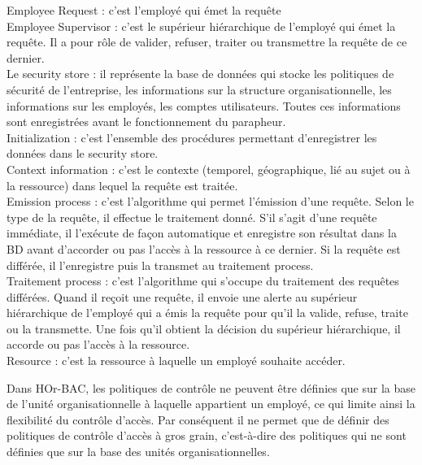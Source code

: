 Employee Request : c'est l'employé qui émet la requête \\
Employee Supervisor : c'est le supérieur hiérarchique de l'employé qui émet la requête. Il a pour rôle de valider, refuser, traiter ou transmettre la requête de ce dernier.\\
Le security store : il représente la base de données qui stocke les politiques de sécurité de l'entreprise, les informations sur la structure organisationnelle, les informations sur les employés, les comptes utilisateurs. Toutes ces informations sont enregistrées avant le fonctionnement du parapheur.\\  
Initialization : c'est l'ensemble des procédures permettant d'enregistrer les données dans le security store.\\
Context information : c'est le contexte (temporel, géographique, lié au sujet ou à la ressource) dans lequel la requête est traitée.\\
Emission process : c'est l'algorithme qui permet l'émission d'une requête. Selon le type de la requête, il effectue le traitement donné. S'il s'agit d'une requête immédiate, il l'exécute de façon automatique et enregistre son résultat dans la BD avant d'accorder ou pas l'accès à la ressource à ce dernier. Si la requête est différée, il l'enregistre puis la transmet au traitement process.\\
Traitement process : c'est l'algorithme qui s'occupe du traitement des requêtes différées. Quand il reçoit une requête, il envoie une alerte au supérieur hiérarchique de l'employé qui a émis la requête pour qu'il la valide, refuse, traite ou la transmette. Une fois qu'il obtient la décision du supérieur hiérarchique, il accorde ou pas l'accès à la ressource.\\
Resource : c'est la ressource à laquelle un employé souhaite accéder.


\label{sectionInconveniantHOr-BAC}

Dans HOr-BAC, les politiques de contrôle ne peuvent être définies que sur la base de l'unité organisationnelle à laquelle appartient un employé, ce qui limite ainsi la flexibilité du contrôle d'accès. Par conséquent il ne permet que de définir des politiques de contrôle d'accès à gros grain, c'est-à-dire des politiques qui ne sont définies que sur la base des unités organisationnelles. 


\label{sectionSyntheseChap1}

